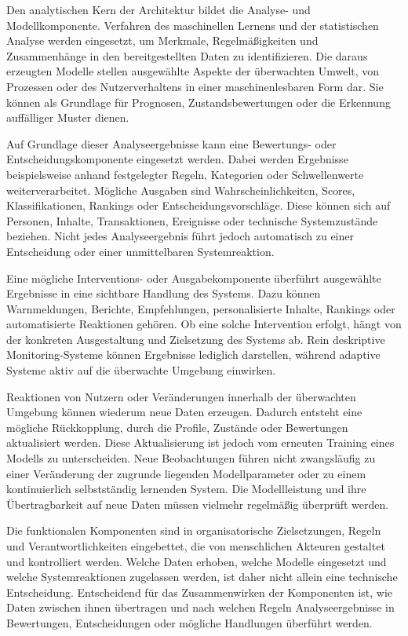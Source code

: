 Den analytischen Kern der Architektur bildet die Analyse- und Modellkomponente. Verfahren des maschinellen Lernens und der statistischen Analyse werden eingesetzt, um Merkmale, Regelmäßigkeiten und Zusammenhänge in den bereitgestellten Daten zu identifizieren. Die daraus erzeugten Modelle stellen ausgewählte Aspekte der überwachten Umwelt, von Prozessen oder des Nutzerverhaltens in einer maschinenlesbaren Form dar. Sie können als Grundlage für Prognosen, Zustandsbewertungen oder die Erkennung auffälliger Muster dienen.

Auf Grundlage dieser Analyseergebnisse kann eine Bewertungs- oder Entscheidungskomponente eingesetzt werden. Dabei werden Ergebnisse beispielsweise anhand festgelegter Regeln, Kategorien oder Schwellenwerte weiterverarbeitet. Mögliche Ausgaben sind Wahrscheinlichkeiten, Scores, Klassifikationen, Rankings oder Entscheidungsvorschläge. Diese können sich auf Personen, Inhalte, Transaktionen, Ereignisse oder technische Systemzustände beziehen. Nicht jedes Analyseergebnis führt jedoch automatisch zu einer Entscheidung oder einer unmittelbaren Systemreaktion.

Eine mögliche Interventions- oder Ausgabekomponente überführt ausgewählte Ergebnisse in eine sichtbare Handlung des Systems. Dazu können Warnmeldungen, Berichte, Empfehlungen, personalisierte Inhalte, Rankings oder automatisierte Reaktionen gehören. Ob eine solche Intervention erfolgt, hängt von der konkreten Ausgestaltung und Zielsetzung des Systems ab. Rein deskriptive Monitoring-Systeme können Ergebnisse lediglich darstellen, während adaptive Systeme aktiv auf die überwachte Umgebung einwirken.

Reaktionen von Nutzern oder Veränderungen innerhalb der überwachten Umgebung können wiederum neue Daten erzeugen. Dadurch entsteht eine mögliche Rückkopplung, durch die Profile, Zustände oder Bewertungen aktualisiert werden. Diese Aktualisierung ist jedoch vom erneuten Training eines Modells zu unterscheiden. Neue Beobachtungen führen nicht zwangsläufig zu einer Veränderung der zugrunde liegenden Modellparameter oder zu einem kontinuierlich selbstständig lernenden System. Die Modellleistung und ihre Übertragbarkeit auf neue Daten müssen vielmehr regelmäßig überprüft werden.

Die funktionalen Komponenten sind in organisatorische Zielsetzungen, Regeln und Verantwortlichkeiten eingebettet, die von menschlichen Akteuren gestaltet und kontrolliert werden. Welche Daten erhoben, welche Modelle eingesetzt und welche Systemreaktionen zugelassen werden, ist daher nicht allein eine technische Entscheidung. Entscheidend für das Zusammenwirken der Komponenten ist, wie Daten zwischen ihnen übertragen und nach welchen Regeln Analyseergebnisse in Bewertungen, Entscheidungen oder mögliche Handlungen überführt werden.

